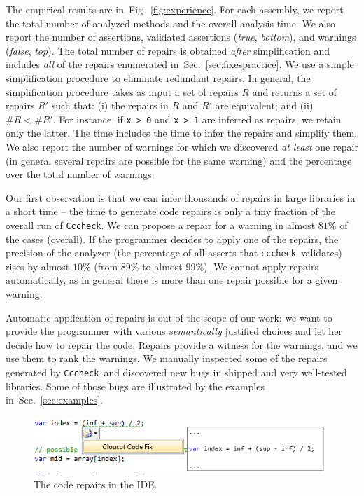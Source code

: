 \documentclass[10pt]{sigplanconf}
\newcommand{\refSection}[1]{Sec.~\ref{sec:#1}}
\newcommand{\refFig}[1]{Fig.~\ref{fig:#1}}
\newcommand{\code}[1]{\texttt{#1}}
\newcommand{\clousot}{\code{cccheck}}
\newcommand{\Clousot}{\code{Cccheck}}
\begin{document}
The empirical results are in~\refFig{experience}.  For each assembly, we report the
total number of analyzed methods and the overall analysis time.
 We also report the number of assertions, validated assertions (\emph{true},
\emph{bottom}), and warnings (\emph{false}, \emph{top}).  The total
number of repairs is obtained \emph{after} simplification and includes
\emph{all} of the repairs enumerated in~\refSection{fixespractice}.  
We use a simple simplification procedure to eliminate redundant
repairs.    
In general, the simplification procedure takes as input a set of repairs $R$ and returns a set of repairs $R'$ such that: (i) the repairs in $R$ and $R'$ are equivalent; and (ii) $\#R < \#R'$.
For instance, if \code{x > 0} and \code{x > 1} are inferred
as repairs, we retain only the latter. 
The time includes the time to
infer the repairs and simplify them.  We also report the number of
warnings for which we discovered \emph{at least} one repair (in
general several repairs are possible for the same warning) and the
percentage over the total number of warnings.

Our first observation is that we can infer thousands of repairs in
large libraries in a short time --
the time to generate code repairs is only a tiny fraction of the overall run of \Clousot.
We can propose a repair for a warning in almost $81\%$ of the
cases (overall).  If the programmer decides to apply one of the
repairs, the precision of the analyzer (the percentage of all asserts
that \clousot\ validates) rises by almost $10\%$ (from $89\%$ to
almost $99\% $).  We cannot apply repairs automatically, as in general
there is more than one repair possible for a given warning.

Automatic application of repairs is out-of-the scope of our work:
we want to provide the programmer with various \emph{semantically}
justified choices and let her decide how to repair the code.  
Repairs provide a witness for the warnings, and we use them to rank the warnings.
We manually inspected some of the repairs generated by \Clousot\ and
discovered new bugs in shipped and very well-tested libraries.  Some
of those bugs are illustrated by the examples
in~\refSection{examples}.

\begin{figure}
\includegraphics[width=\columnwidth]{./BinarySearchFix} 
\caption{The code repairs in the IDE.}
\label{fig:roslyn}
\end{figure}
\end{document}
